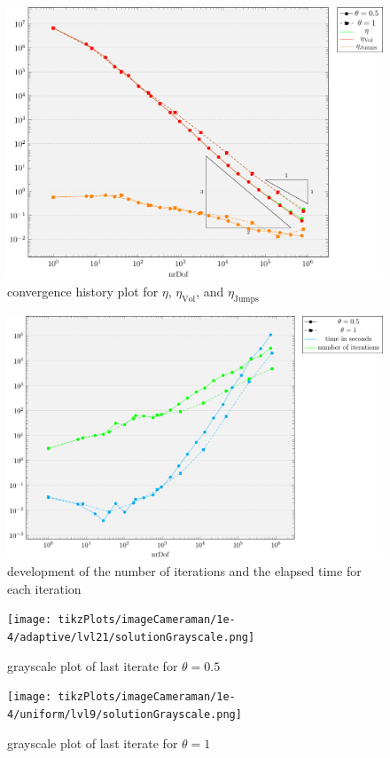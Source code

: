 \documentclass[draft=false,twoside,12pt]{scrreprt}
\begin{document}
\begin{figure}[H]
	\centering
	\includegraphics[width=16cm]
  {tikzPlots/imageCameraman/convergence.pdf}
  \caption{convergence history plot for $\eta$,
  $\eta_\text{Vol}$, and $\eta_\text{Jumps}$}
\end{figure}

\begin{figure}[H]
	\centering
	\includegraphics[width=16cm]{tikzPlots/imageCameraman/misc.pdf}
  \caption{development of the number of iterations and the elapsed time for 
  each iteration}
\end{figure}

\begin{minipage}[t]{0.5\textwidth}
  \begin{figure}[H]
	  \centering
		\texttt{[image: tikzPlots/imageCameraman/1e-4/adaptive/lvl21/solutionGrayscale.png]}
    \caption{grayscale plot of last iterate for $\theta = 0.5$}
  \end{figure}
\end{minipage}
\begin{minipage}[t]{0.5\textwidth}
  \begin{figure}[H]
	  \centering
		\texttt{[image: tikzPlots/imageCameraman/1e-4/uniform/lvl9/solutionGrayscale.png]}
    \caption{grayscale plot of last iterate for $\theta = 1$}
  \end{figure}
\end{minipage}
\end{document}
